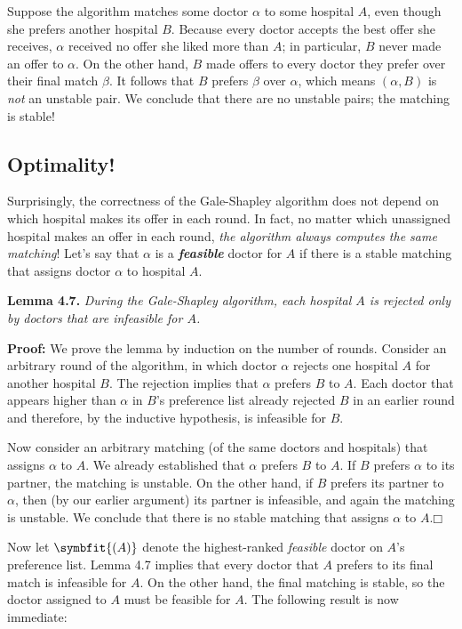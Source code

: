 Suppose the algorithm matches some doctor $\alpha$ to some hospital $A$, even though she prefers another hospital $B$.
Because every doctor accepts the best offer she receives, $\alpha$ received no offer she liked more than $A$; in particular, $B$ never made an offer to $\alpha$.
On the other hand, $B$ made offers to every doctor they prefer over their final match $\beta$.
It follows that $B$ prefers $\beta$ over $\alpha$, which means $(\alpha, B)$ is \textit{not} an unstable pair.
We conclude that there are no unstable pairs; the matching is stable!

\subsection{Optimality!}

Surprisingly, the correctness of the Gale-Shapley algorithm does not depend on which hospital makes its offer in each round.
In fact, no matter which unassigned hospital makes an offer in each round, \textit{the algorithm always computes the same matching}!
Let’s say that $\alpha$ is a \textbf{\textit{feasible}} doctor for $A$ if there is a stable matching that assigns doctor $\alpha$ to hospital $A$.

\noindent\textbf{Lemma 4.7.} \textsl{During the Gale-Shapley algorithm, each hospital $A$ is rejected only by doctors that are infeasible for $A$.}

\noindent\textbf{Proof:} We prove the lemma by induction on the number of rounds.
Consider an arbitrary round of the algorithm, in which doctor $\alpha$ rejects one hospital $A$ for another hospital $B$.
The rejection implies that $\alpha$ prefers $B$ to $A$.
Each doctor that appears higher than $\alpha$ in $B$’s preference list already rejected $B$ in an earlier round and therefore, by the inductive hypothesis, is infeasible for $B$.

Now consider an arbitrary matching (of the same doctors and hospitals) that assigns $\alpha$ to $A$.
We already established that $\alpha$ prefers $B$ to $A$.
If $B$ prefers $\alpha$ to its partner, the matching is unstable.
On the other hand, if $B$ prefers its partner to $\alpha$, then (by our earlier argument) its partner is infeasible, and again the matching is unstable.
We conclude that there is no stable matching that assigns $\alpha$ to $A$.\hfill$\mdlgwhtsquare$

Now let \textbf{}$\symbfit{(A)}$ denote the highest-ranked \textit{feasible} doctor on $A$’s preference list.
Lemma 4.7 implies that every doctor that $A$ prefers to its final match is infeasible for $A$.
On the other hand, the final matching is stable, so the doctor assigned to $A$ must be feasible for $A$.
The following result is now immediate:

